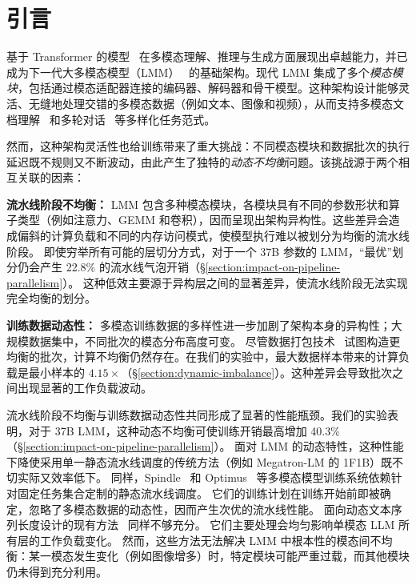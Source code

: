 \section{引言}

基于 Transformer 的模型~\cite{transformer-nips17,qwen2-5-arxiv25,deepseek-v3-arxiv25,llama3-arxiv24} 在多模态理解、推理与生成方面展现出卓越能力，并已成为下一代大多模态模型（LMM）~\cite{qwen2.5-vl-arxiv25,gpt4o-arxiv24,llama3-arxiv24,step-audio-arxiv25,step-t2v-arxiv25,gemini-3-2025} 的基础架构。现代 LMM 集成了多个\emph{模态模块}，包括通过模态适配器连接的编码器、解码器和骨干模型。这种架构设计能够灵活、无缝地处理交错的多模态数据（例如文本、图像和视频），从而支持多模态文档理解~\cite{mlongdoc-arxiv24} 和多轮对话~\cite{gpt4o-image-generation} 等多样化任务范式。

然而，这种架构灵活性也给训练带来了重大挑战：不同模态模块和数据批次的执行延迟既不规则又不断波动，由此产生了独特的\emph{动态不均衡}问题。该挑战源于两个相互关联的因素：

\textbf{流水线阶段不均衡：}
LMM 包含多种模态模块，各模块具有不同的参数形状和算子类型（例如注意力、GEMM 和卷积），因而呈现出架构异构性。这些差异会造成偏斜的计算负载和不同的内存访问模式，使模型执行难以被划分为均衡的流水线阶段。
即使穷举所有可能的层切分方式，对于一个 37B 参数的 LMM，“最优”划分仍会产生 22.8\% 的流水线气泡开销（\S\ref{section:impact-on-pipeline-parallelism}）。
这种低效主要源于异构层之间的显著差异，使流水线阶段无法实现完全均衡的划分。

\textbf{训练数据动态性：}
多模态训练数据的多样性进一步加剧了架构本身的异构性；大规模数据集中，不同批次的模态分布高度可变。
尽管数据打包技术~\cite{wlb-llm-osdi25,dynapipe-eurosys24} 试图构造更均衡的批次，计算不均衡仍然存在。在我们的实验中，最大数据样本带来的计算负载是最小样本的 $4.15\times$（\S\ref{section:dynamic-imbalance}）。这种差异会导致批次之间出现显著的工作负载波动。

流水线阶段不均衡与训练数据动态性共同形成了显著的性能瓶颈。我们的实验表明，对于 37B LMM，这种动态不均衡可使训练开销最高增加 40.3\%（\S\ref{section:impact-on-pipeline-parallelism}）。
面对 LMM 的动态特性，这种性能下降使采用单一静态流水线调度的传统方法（例如 Megatron-LM 的 1F1B）既不切实际又效率低下。
同样，Spindle~\cite{spindle-asplos25} 和 Optimus~\cite{optimus-atc25} 等多模态模型训练系统依赖针对固定任务集合定制的静态流水线调度。
它们的训练计划在训练开始前即被确定，忽略了多模态数据的动态性，因而产生次优的流水线性能。
面向动态文本序列长度设计的现有方法~\cite{wlb-llm-osdi25,dynapipe-eurosys24,flexpipe-atc25} 同样不够充分。
它们主要处理会均匀影响单模态 LLM 所有层的工作负载变化。
然而，这些方法无法解决 LMM 中根本性的模态间不均衡：某一模态发生变化（例如图像增多）时，特定模块可能严重过载，而其他模块仍未得到充分利用。

